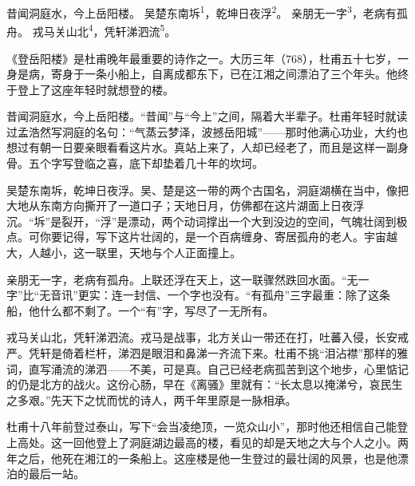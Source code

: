 
\begin{poem}
昔闻洞庭水，今上岳阳楼。
吴楚东南坼\textsuperscript{1}，乾坤日夜浮\textsuperscript{2}。
亲朋无一字\textsuperscript{3}，老病有孤舟。
戎马关山北\textsuperscript{4}，凭轩涕泗流\textsuperscript{5}。
\end{poem}

\begin{annotations}
\end{annotations}

\begin{appreciation}
《登岳阳楼》是杜甫晚年最重要的诗作之一。大历三年（768），杜甫五十七岁，一身是病，寄身于一条小船上，自离成都东下，已在江湘之间漂泊了三个年头。他终于登上了这座年轻时就想登的楼。

昔闻洞庭水，今上岳阳楼。“昔闻”与“今上”之间，隔着大半辈子。杜甫年轻时就读过孟浩然写洞庭的名句：“气蒸云梦泽，波撼岳阳城”——那时他满心功业，大约也想过有朝一日要亲眼看看这片水。真站上来了，人却已经老了，而且是这样一副身骨。五个字写登临之喜，底下却垫着几十年的坎坷。

吴楚东南坼，乾坤日夜浮。吴、楚是这一带的两个古国名，洞庭湖横在当中，像把大地从东南方向撕开了一道口子；天地日月，仿佛都在这片湖面上日夜浮沉。“坼”是裂开，“浮”是漂动，两个动词撑出一个大到没边的空间，气魄壮阔到极点。可你要记得，写下这片壮阔的，是一个百病缠身、寄居孤舟的老人。宇宙越大，人越小，这一联里，天地与个人正面撞上。

亲朋无一字，老病有孤舟。上联还浮在天上，这一联骤然跌回水面。“无一字”比“无音讯”更实：连一封信、一个字也没有。“有孤舟”三字最重：除了这条船，他什么都不剩了。一个“有”字，写尽了一无所有。

戎马关山北，凭轩涕泗流。戎马是战事，北方关山一带还在打，吐蕃入侵，长安戒严。凭轩是倚着栏杆，涕泗是眼泪和鼻涕一齐流下来。杜甫不挑“泪沾襟”那样的雅词，直写涌流的涕泗——不美，可是真。自己已经老病孤苦到这个地步，心里惦记的仍是北方的战火。这份心肠，早在《离骚》里就有：“长太息以掩涕兮，哀民生之多艰。”先天下之忧而忧的诗人，两千年里原是一脉相承。

杜甫十八年前登过泰山，写下“会当凌绝顶，一览众山小”，那时他还相信自己能登上高处。这一回他登上了洞庭湖边最高的楼，看见的却是天地之大与个人之小。两年之后，他死在湘江的一条船上。这座楼是他一生登过的最壮阔的风景，也是他漂泊的最后一站。
\end{appreciation}
